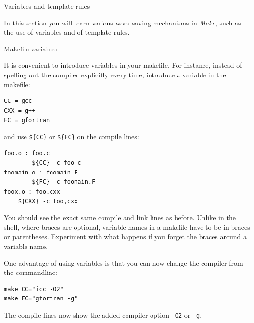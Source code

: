  {Variables and template rules}

\begin{purpose}
  In this section you will learn various work-saving mechanisms in
  \emph{Make}, such as the use of variables and of template rules.
\end{purpose}

 {Makefile variables}

It is convenient to introduce variables in your makefile.
For instance, 
instead of spelling out the compiler explicitly every time, introduce a
variable in the makefile:
\begin{lstlisting}
CC = gcc
CXX = g++
FC = gfortran
\end{lstlisting}
and use \verb+${CC}+ or \verb+${FC}+ on the compile lines:
\begin{lstlisting}
foo.o : foo.c
        ${CC} -c foo.c
foomain.o : foomain.F
        ${FC} -c foomain.F
foox.o : foo.cxx
	${CXX} -c foo,cxx
\end{lstlisting}
  {You should see the exact same compile and link lines as before.}
  {Unlike in the shell, where braces are optional, variable names in a
    makefile have to be in
    braces or parentheses. Experiment with what happens if you forget
    the braces around a variable name.}

One
advantage of using variables is that you can now change the compiler
from the commandline:
\begin{lstlisting}
make CC="icc -O2"
make FC="gfortran -g"
\end{lstlisting}

  {The compile lines now show the added compiler option \lstinline{-O2} or \lstinline{-g}.}{}

